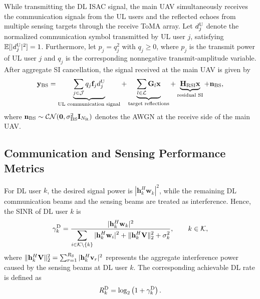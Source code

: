 \documentclass[letterpaper,journal]{IEEEtran}
\begin{document}
While transmitting the DL ISAC signal, the main UAV simultaneously receives the communication signals from the UL users and the reflected echoes from multiple sensing targets through the receive ToMA array. Let $d_j^{\rm U}$ denote the normalized communication symbol transmitted by UL user $j$, satisfying $\mathbb E[|d_j^{\rm U}|^2]=1$. Furthermore, let $p_j=q_j^2$ with $q_j\ge0$, where $p_j$ is the transmit power of UL user $j$ and $q_j$ is the corresponding nonnegative transmit-amplitude variable. After aggregate SI cancellation, the signal received at the main UAV is given by
\begin{equation}
\mathbf y_{\rm BS}
=
\underbrace{
\sum_{j\in\mathcal J}
q_j\mathbf f_jd_j^{\rm U}
}_{\text{UL communication signal}}
+
\underbrace{
\sum_{l\in\mathcal L}
\mathbf G_l\mathbf x
}_{\text{target reflections}}
+
\underbrace{
\mathbf H_{\rm RSI}\mathbf x
}_{\text{residual SI}}
+
\mathbf n_{\rm BS},
\label{eq:bs_received_signal}
\end{equation}
where $\mathbf n_{\rm BS}\sim\mathcal{CN}(\mathbf 0,\sigma_{\rm BS}^2\mathbf I_{N_{\rm R}})$ denotes the AWGN at the receive side of the main UAV.

\subsection{Communication and Sensing Performance Metrics}
\label{subsec:performance_metrics}

For DL user $k$, the desired signal power is $|\mathbf h_k^H\mathbf w_k|^2$, while the remaining DL communication beams and the sensing beams are treated as interference. Hence, the SINR of DL user $k$ is
\begin{equation}
\gamma_k^{\rm D}
=
\frac{
|\mathbf h_k^H\mathbf w_k|^2
}{
\displaystyle
\sum_{i\in\mathcal K\setminus\{k\}}
|\mathbf h_k^H\mathbf w_i|^2
+
\|\mathbf h_k^H\mathbf V\|_2^2
+
\sigma_k^2
},
\qquad
k\in\mathcal K,
\label{eq:dl_sinr}
\end{equation}
where $\|\mathbf h_k^H\mathbf V\|_2^2=\sum_{r=1}^{R_{\rm S}}|\mathbf h_k^H\mathbf v_r|^2$ represents the aggregate interference power caused by the sensing beams at DL user $k$. The corresponding achievable DL rate is defined as
\begin{equation}
R_k^{\rm D}
=
\log_2
\left(
1+\gamma_k^{\rm D}
\right).
\label{eq:dl_rate}
\end{equation}
\end{document}
